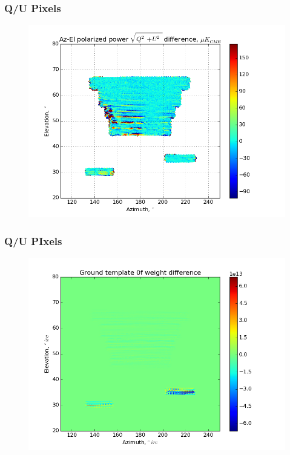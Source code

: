 \documentclass{beamer}
\begin{document}
\begin{frame}
\frametitle{Q/U Pixels}
\begin{figure}
\includegraphics[width=0.9\linewidth]{dMag_gt_QU_PIXEL.png}
\end{figure}
\end{frame}

\begin{frame}
\frametitle{Q/U PIxels}
\begin{figure}
\includegraphics[width=0.9\linewidth]{dw0_gt_QU_PIXEL.png}
\end{figure}
\end{frame}
\end{document}
